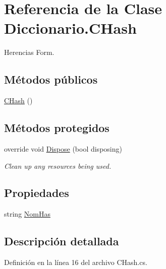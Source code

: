 \hypertarget{class_diccionario_1_1_c_hash}{\section{Referencia de la Clase Diccionario.\-C\-Hash}
\label{class_diccionario_1_1_c_hash}
}


Herencias Form.

\subsection*{Métodos públicos}
\begin{DoxyCompactItemize}
\item 
\hyperlink{class_diccionario_1_1_c_hash_abfa7bf5ae304c9fffee822560545fc21}{C\-Hash} ()
\end{DoxyCompactItemize}
\subsection*{Métodos protegidos}
\begin{DoxyCompactItemize}
\item 
override void \hyperlink{class_diccionario_1_1_c_hash_a4be5dd4938bb97baedff0e47c7b221f4}{Dispose} (bool disposing)
\begin{DoxyCompactList}\small\item\em Clean up any resources being used. \end{DoxyCompactList}\end{DoxyCompactItemize}
\subsection*{Propiedades}
\begin{DoxyCompactItemize}
\item 
string \hyperlink{class_diccionario_1_1_c_hash_adb91b6401e6686dcdd4e1f77ccd5eb51}{Nom\-Has}
\end{DoxyCompactItemize}


\subsection{Descripción detallada}


Definición en la línea 16 del archivo C\-Hash.\-cs.



